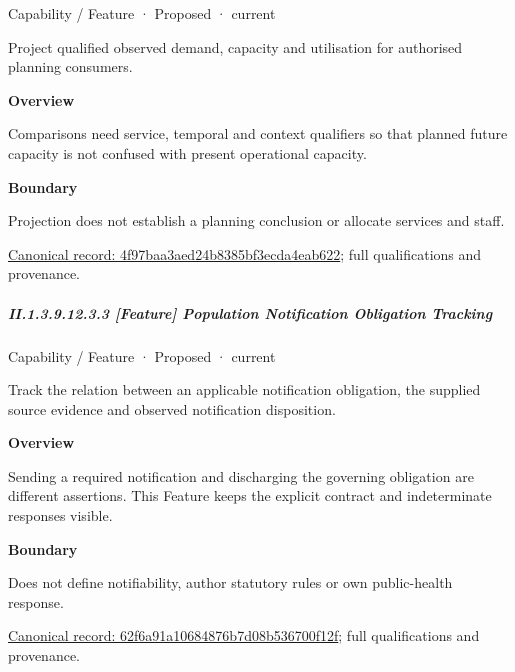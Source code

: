 \label{element:4f97baa3aed24b8385bf3ecda4eab622}
{\small Capability / Feature · Proposed · current}\par

Project qualified observed demand, capacity and utilisation for authorised planning consumers.



\textbf{Overview}



Comparisons need service, temporal and context qualifiers so that planned future capacity is not confused with present operational capacity.



\textbf{Boundary}



Projection does not establish a planning conclusion or allocate services and staff.


{\footnotesize \href{../../../../../../../continuum/strategy/capability/feature/4f97baa3aed24b8385bf3ecda4eab622.md}{Canonical record: 4f97baa3aed24b8385bf3ecda4eab622}; full qualifications and provenance.}\par
\subparagraph*{II.1.3.9.12.3.3 [Feature] Population Notification Obligation Tracking}
\label{navigation:II.1.3.9.12.3.3}

\label{element:62f6a91a10684876b7d08b536700f12f}
{\small Capability / Feature · Proposed · current}\par

Track the relation between an applicable notification obligation, the supplied source evidence and observed notification disposition.



\textbf{Overview}



Sending a required notification and discharging the governing obligation are different assertions. This Feature keeps the explicit contract and indeterminate responses visible.



\textbf{Boundary}



Does not define notifiability, author statutory rules or own public-health response.


{\footnotesize \href{../../../../../../../continuum/strategy/capability/feature/62f6a91a10684876b7d08b536700f12f.md}{Canonical record: 62f6a91a10684876b7d08b536700f12f}; full qualifications and provenance.}\par
